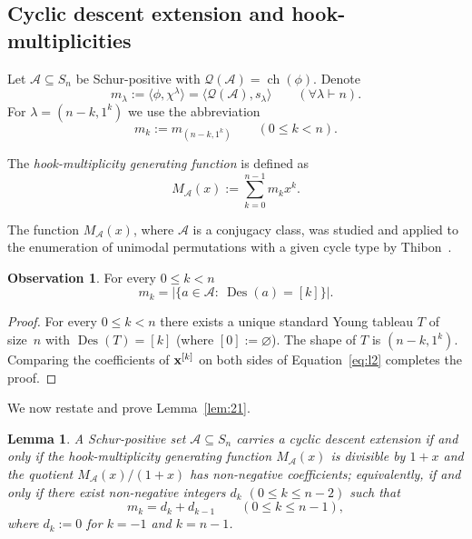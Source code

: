 \documentclass[10pt]{article}
\newtheorem{lemma}[theorem]{Lemma}
\theoremstyle{definition}
\newcommand{\Q}{\mathcal Q}
\newcommand{\A}{\mathcal A}
\DeclareMathOperator\Des{Des}
\newcommand{\ch}{{\operatorname{ch}}}
\newcommand{\card}[1]{\ensuremath{\left|#1\right|}}
\newtheorem{observation}[cdrthm]{Observation}
\begin{document}
\subsection{Cyclic descent extension and hook-multiplicities}\label{sec:hook_criterion}
	
Let $\A\subseteq S_n$ be Schur-positive with $\Q(\A) = \ch(\phi)$.
Denote
\[
    m_\lambda 
    := \langle \phi, \chi^\lambda \rangle 
    = \langle \Q(\A), s_\lambda \rangle
\qquad (\forall \lambda \vdash n).
\]
For $\lambda = (n-k,1^k)$ we use the abbreviation 
\[
m_k := m_{(n-k,1^k)} 
\qquad (0 \le k < n).
\]

The {\em hook-multiplicity generating function} is defined as 
\[
M_{\A}(x):=\sum_{k=0}^{n-1} m_k x^k.
\]

The function $M_{\A}(x)$, where $\A$ 
is a conjugacy class, 
was studied and applied to the enumeration of unimodal permutations with a given cycle type by Thibon~\cite{Thibon}. 

\begin{observation}\label{lem:1}
    For every $0\le k <n$
    \[
        m_k = \card{\{a\in \A:\ \Des(a)=[k]\}}.
    \]
\end{observation}

\begin{proof}
    For every $0 \le k < n$ there exists 
    a unique standard Young tableau $T$ of size~$n$ with
    $\Des(T) = [k]$ (where $[0] := \varnothing$). 
    The shape of $T$ is $(n-k,1^k)$.
    Comparing the coefficients of ${\bf x}^{[k]}$ on both sides of Equation~\eqref{eq:l2} completes the proof.
\end{proof}

We now restate and prove Lemma~\ref{lem:21}.

\begin{lemma}\label{lem:2}
    A Schur-positive set $\A \subseteq S_n$ carries a cyclic descent extension if and only if 
    the hook-multiplicity generating function $M_\A(x)$ 
    is divisible by $1+x$
    and the quotient $M_\A(x)/(1+x)$ has non-negative coefficients; 
    equivalently, if and only if
    there exist non-negative integers $d_k$ $(0 \le k \le n-2)$ such that
    \[
        m_k = d_k + d_{k-1} \qquad (0 \le k \le n-1),
    \]
    where $d_k := 0$ for $k = -1$ and $k = n-1$.
\end{lemma}
	
\end{document}
